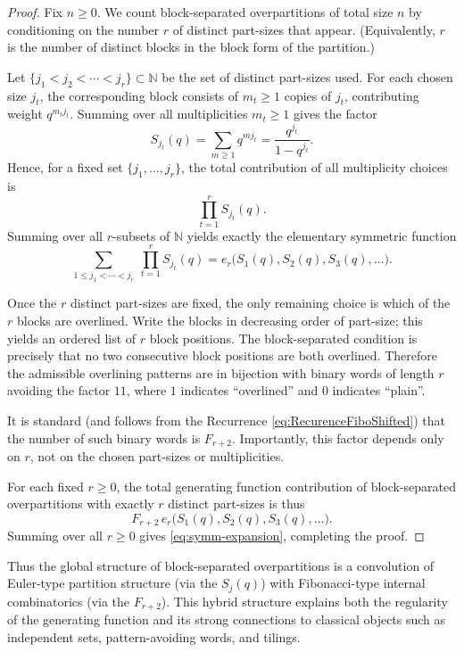 \documentclass[letterpaper,12pt]{article}
\begin{document}
\begin{proof}
Fix $n\ge 0$. We count block-separated overpartitions of total size $n$ by conditioning on the
number $r$ of distinct part-sizes that appear. (Equivalently, $r$ is the number of
distinct blocks in the block form of the partition.)

 
Let $\{j_1<j_2<\cdots<j_r\}\subset\mathbb{N}$ be the set of distinct part-sizes used.
For each chosen size $j_t$, the corresponding block consists of $m_t\ge 1$ copies of $j_t$,
contributing weight $q^{m_t j_t}$. Summing over all multiplicities $m_t\ge 1$ gives the factor
\[
S_{j_t}(q)=\sum_{m\ge 1} q^{mj_t}=\frac{q^{j_t}}{1-q^{j_t}}.
\]
Hence, for a fixed set $\{j_1,\dots,j_r\}$, the total contribution of all multiplicity choices is
\[
\prod_{t=1}^r S_{j_t}(q).
\]
Summing over all $r$-subsets of $\mathbb{N}$ yields exactly the elementary symmetric function
\[
\sum_{1\le j_1<\cdots<j_r}\ \prod_{t=1}^r S_{j_t}(q)
= e_r\!\bigl(S_1(q),S_2(q),S_3(q),\dots\bigr).
\]

  
Once the $r$ distinct part-sizes are fixed, the only remaining choice is which of the $r$ blocks
are overlined. Write the blocks in decreasing order of part-size; this yields an ordered list of
$r$ block positions. The block-separated condition is precisely that no two consecutive block
positions are both overlined. Therefore the admissible overlining patterns are in bijection with
binary words of length $r$ avoiding the factor $11$, where $1$ indicates ``overlined'' and $0$
indicates ``plain''.

It is standard (and follows from the Recurrence \eqref{eq:RecurenceFiboShifted})
that the number of such binary words is $F_{r+2}$. Importantly, this factor depends only on $r$,
not on the chosen part-sizes or multiplicities.

 
 
For each fixed $r\ge 0$, the total generating function contribution of block-separated
overpartitions with exactly $r$ distinct part-sizes is thus
\[
F_{r+2}\,e_r\!\bigl(S_1(q),S_2(q),S_3(q),\dots\bigr).
\]
Summing over all $r\ge 0$ gives \eqref{eq:symm-expansion}, completing the proof.
\end{proof}


Thus the global structure of block-separated overpartitions is a convolution of
Euler-type partition structure (via the $S_j(q)$) with Fibonacci-type internal
combinatorics (via the $F_{r+2}$). This hybrid structure explains both the
regularity of the generating function and its strong connections to classical
objects such as independent sets, pattern-avoiding words, and tilings.
\end{document}

